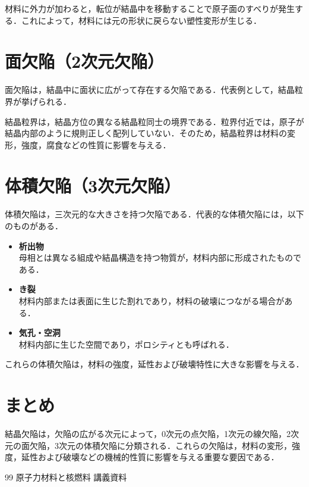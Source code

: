 \documentclass[titlepage,a4paper]{jsarticle}
\begin{document}
材料に外力が加わると，転位が結晶中を移動することで原子面のすべりが発生する．これによって，材料には元の形状に戻らない塑性変形が生じる．

\section{面欠陥（2次元欠陥）}

面欠陥は，結晶中に面状に広がって存在する欠陥である．代表例として，結晶粒界が挙げられる．

結晶粒界は，結晶方位の異なる結晶粒同士の境界である．粒界付近では，原子が結晶内部のように規則正しく配列していない．そのため，結晶粒界は材料の変形，強度，腐食などの性質に影響を与える．

\section{体積欠陥（3次元欠陥）}

体積欠陥は，三次元的な大きさを持つ欠陥である．代表的な体積欠陥には，以下のものがある．

\begin{itemize}
    \item \textbf{析出物}\\
    母相とは異なる組成や結晶構造を持つ物質が，材料内部に形成されたものである．

    \item \textbf{き裂}\\
    材料内部または表面に生じた割れであり，材料の破壊につながる場合がある．

    \item \textbf{気孔・空洞}\\
    材料内部に生じた空間であり，ポロシティとも呼ばれる．
\end{itemize}

これらの体積欠陥は，材料の強度，延性および破壊特性に大きな影響を与える．

\section{まとめ}

結晶欠陥は，欠陥の広がる次元によって，0次元の点欠陥，1次元の線欠陥，2次元の面欠陥，3次元の体積欠陥に分類される．これらの欠陥は，材料の変形，強度，延性および破壊などの機械的性質に影響を与える重要な要因である．


\begin{thebibliography}{99}
\bibitem{} 原子力材料と核燃料 講義資料
\end{thebibliography}
\end{document}
